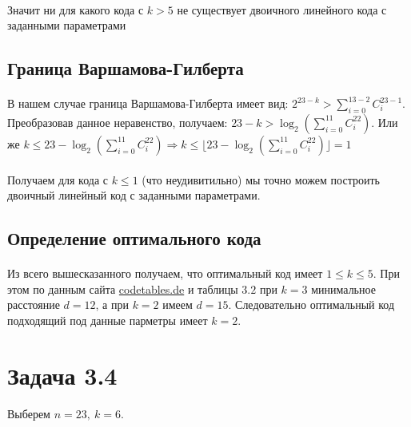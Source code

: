 \documentclass[fontsize=14pt]{article}
\begin{document}
\paragraph*{}
Значит ни для какого кода с $k > 5$ не существует двоичного линейного кода с заданными параметрами

\subsection*{Граница Варшамова-Гилберта}

\paragraph*{}
В нашем случае граница Варшамова-Гилберта имеет вид: $2^{23 - k} > \sum\limits_{i = 0}^{13 - 2} C_i^{23 - 1}$. Преобразовав данное неравенство, получаем: $23 - k > \log_2 \left( \sum\limits_{i = 0}^{11} C_i^{22} \right)$. Или же $k \leq 23 - \log_2 \left( \sum\limits_{i = 0}^{11} C_i^{22} \right)
\Rightarrow
k \leq \lfloor 23 -  \log_2 \left( \sum\limits_{i = 0}^{11} C_i^{22} \right) \rfloor = 1
$

\paragraph*{}
Получаем для кода с $k \leq 1$ (что неудивитильно) мы точно можем построить двоичный линейный код с заданными параметрами.

\subsection*{Определение оптимального кода}

\paragraph*{}
Из всего вышесказанного получаем, что оптимальный код имеет $1 \leq k \leq 5$. При этом по данным сайта \href{http://www.codetables.de}{codetables.de} и таблицы $3.2$ при $k = 3$ минимальное расстояние $d = 12$, а при $k = 2$ имеем $d = 15$. Следовательно оптимальный код подходящий под данные парметры имеет $k = 2$.

\section*{Задача 3.4}

\paragraph*{}
Выберем $n = 23,\ k = 6$.
\end{document}
